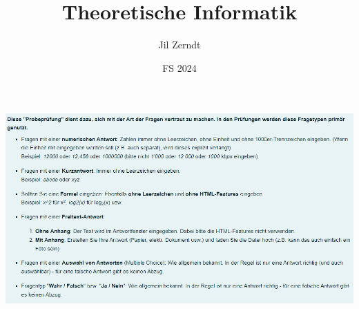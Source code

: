 \documentclass[a4paper, fontsize = 8pt, landscape]{scrartcl}
\title{Theoretische Informatik}
\author{Jil Zerndt}
\date{FS 2024}
\begin{document}
\begin{multicols*}{3}
    \thispagestyle{TitlePageStyle}
		\maketitle

    
    \raggedcolumns
    
    \raggedcolumns
    
    \raggedcolumns
    
    \raggedcolumns
    
    \raggedcolumns
    
    \raggedcolumns
    
    \raggedcolumns
    
    \raggedcolumns
    \columnbreak
    
    \raggedcolumns
    \columnbreak
    
    \raggedcolumns

    

    \newpage

\includegraphics[width=2\linewidth]{images/methodik.png}

\end{multicols*}
\end{document}
